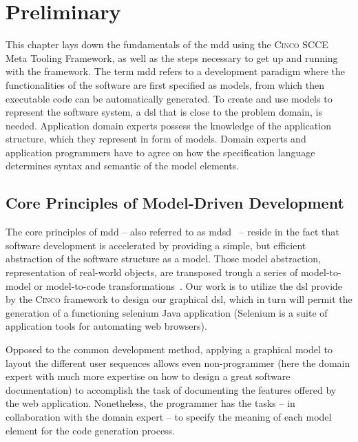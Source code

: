 
\chapter{Preliminary}\label{ch:Basis}

This chapter lays down the fundamentals of the \acrfull{mdd} using the \textsc{Cinco} SCCE Meta Tooling Framework, as well as the steps necessary to get up and running with the framework. The term \acrshort{mdd} refers to a development paradigm where the functionalities of the software are first specified as models, from which then executable code can be automatically generated. To create and use models to represent the software system, a \acrfull{dsl} that is close to the problem domain, is needed. Application domain experts possess the knowledge of the application structure, which they represent in form of models. Domain experts and application programmers have to agree on how the specification language determines syntax and semantic of the model elements.

\section{Core Principles of Model-Driven Development}

The core principles of \acrfull{mdd} -- also referred to as \acrfull{mdsd}~\cite{fowler} -- reside in the fact that software development is accelerated by providing a simple, but efficient abstraction of the software structure as a model. Those model abstraction, representation of real-world objects, are transposed trough a series of model-to-model or model-to-code transformations~\cite{stahl_et_al}. Our work is to utilize the \acrshort{dsl} provide by the \textsc{Cinco} framework to design our graphical \acrshort{dsl}, which in turn will permit the generation of a functioning \gls{selenium} Java application (Selenium is a suite of application tools for automating web browsers).

Opposed to the common development method, applying a graphical model to layout the different user sequences allows even non-programmer (here the domain expert with much more expertise on how to design a great software documentation) to accomplish the task of documenting the features offered by the web application. Nonetheless, the programmer has the tasks -- in collaboration with the domain expert -- to specify the meaning of each model element for the code generation process. 


